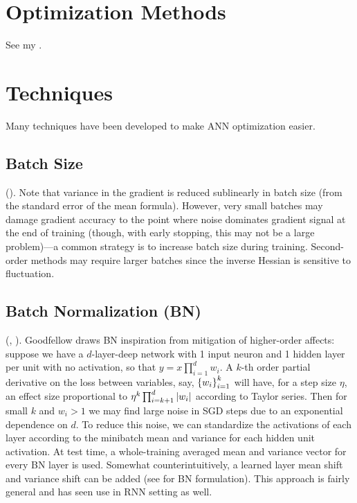 \documentclass{article}
\begin{document}
\section{Optimization Methods}

See my .

\section{Techniques}\label{sec:techniques}

Many techniques have been developed to make ANN optimization easier.

\subsection{Batch Size}

(). Note that variance in the gradient is reduced sublinearly in batch size (from the standard error of the mean formula). However, very small batches may damage gradient accuracy to the point where noise dominates gradient signal at the end of training (though, with early stopping, this may not be a large problem)---a common strategy is to increase batch size during training. Second-order methods may require larger batches since the inverse Hessian is sensitive to fluctuation.

\subsection{Batch Normalization (BN)}

(, ). Goodfellow draws BN inspiration from mitigation of higher-order affects: suppose we have a $d$-layer-deep network with 1 input neuron and 1 hidden layer per unit with no activation, so that $y=x\prod_{i=1}^dw_i$. A $k$-th order partial derivative on the loss between variables, say, $\left\{{w_i}\right\}_{i=1}^k$ will have, for a step size $\eta$, an effect size proportional to $\eta^k\prod_{i=k + 1}^{d}\left|{w_i}\right|$ according to Taylor series. Then for small $k$ and $w_i>1$ we may find large noise in SGD steps due to an exponential dependence on $d$. To reduce this noise, we can standardize the activations of each layer according to the minibatch mean and variance for each hidden unit activation. At test time, a whole-training averaged mean and variance vector for every BN layer is used. Somewhat counterintuitively, a learned layer mean shift and variance shift can be added (see  for BN formulation). This approach is fairly general and has seen use in RNN setting as well.
\end{document}
